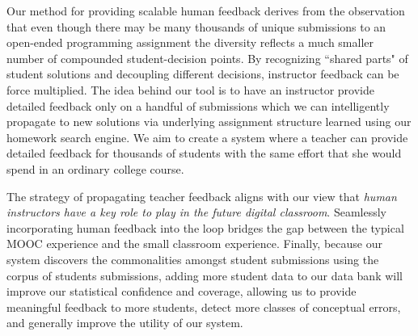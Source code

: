 Our method for providing scalable human feedback derives from the observation that even though there may be many thousands of unique submissions to an open-ended programming assignment the diversity reflects a much smaller number of compounded student-decision points. By recognizing ``shared parts" of student solutions and decoupling different decisions, instructor feedback can be force multiplied. The idea behind our tool is to have an instructor provide detailed feedback only on a handful of submissions which we can intelligently propagate to new solutions via underlying assignment structure learned using our homework search engine. We aim to create a system where a teacher can provide detailed 
feedback for thousands of students with the same effort that she would spend in an ordinary college course.

The strategy of propagating teacher feedback aligns with our view that \emph{human instructors have a key role to play in the future digital classroom}. Seamlessly incorporating human feedback into the loop bridges the gap between the typical MOOC experience and the small classroom experience.
 Finally, because our system discovers the commonalities amongst student submissions using the corpus of students submissions, adding more student data to our data bank
 will improve our statistical confidence and coverage, 
 allowing us to provide meaningful feedback to more students, detect more classes of conceptual errors, and generally improve the utility of our system.


